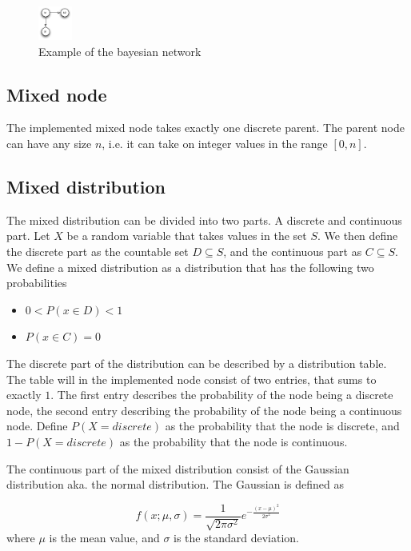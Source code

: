 \documentclass[10pt, conference, compsocconf,a4paper]{IEEEtran}
\begin{document}
\begin{figure}[ht]
\centering
\includegraphics[width=0.1\textwidth]{figures/fig2.pdf}
\caption{Example of the bayesian network}
\label{label}
\end{figure}

\subsection{Mixed node} %
\label{sub:mixed_node}
The implemented mixed node takes exactly one discrete parent. The parent node can have any size $n$, i.e. it can take on integer values in the range $[0,n]$.


\subsection{Mixed distribution} %
\label{sub:mixed_distribution}
The mixed distribution can be divided into two parts. A discrete and continuous part. Let $X$ be a random variable that takes values in the set $S$. We then define the discrete part as the countable set $D \subseteq S$, and the continuous part as $C \subseteq S$. We define a mixed distribution as a distribution that has the following two probabilities

\begin{itemize}
  \item $0 < P(x \in D) < 1$
  \item $P(x \in C) = 0$
\end{itemize} 

The discrete part of the distribution can be described by a distribution table. The table will in the implemented node consist of two entries, that sums to exactly $1$. The first entry describes the probability of the node being a discrete node, the second entry describing the probability of the node being a continuous node. Define $P(X = discrete)$ as the probability that the node is discrete, and $1-P(X = discrete)$ as the probability that the node is continuous. 

The continuous part of the mixed distribution consist of the Gaussian distribution aka. the normal distribution. The Gaussian is defined as

\begin{equation}
f(x;\mu,\sigma) = \frac{1}{\sqrt{2\pi\sigma^2}} e^{ -\frac{(x-\mu)^2}{2\sigma^2} }  
\end{equation}
where $\mu$ is the mean value, and $\sigma$ is the standard deviation.
\end{document}
